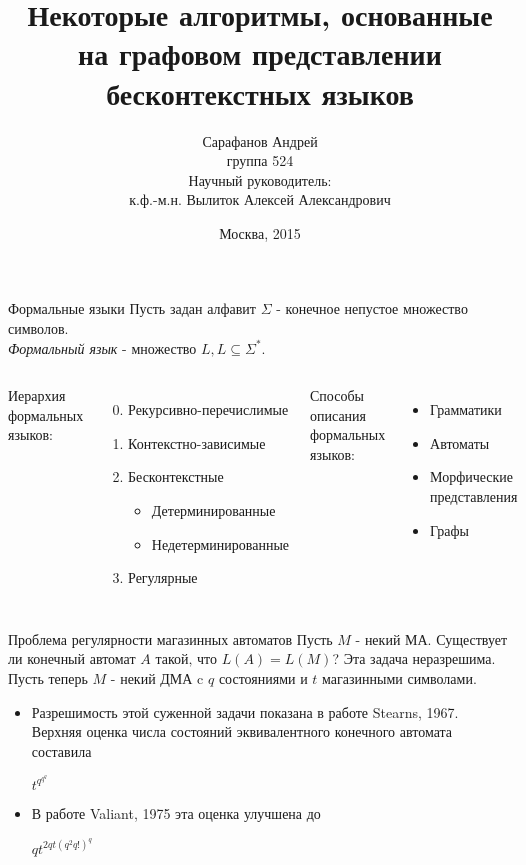 \documentclass{beamer}
\title []{Некоторые алгоритмы, основанные на графовом представлении бесконтекстных языков}
\author {Сарафанов Андрей \\ \small{группа 524\\ \vspace{1cm}Научный руководитель:\\
  к.ф.-м.н. Вылиток Алексей Александрович\\}}
\date {\footnotesize{Москва, 2015}}
\begin{document}
\begin{frame}
  \titlepage
\end{frame}

\begin{frame} {Формальные языки}
Пусть задан алфавит $\Sigma$ - конечное непустое множество символов.\\
\textit{Формальный язык} - множество $L, L\subseteq \Sigma^*$.
\vspace{5mm} %
\begin{columns}
    Иерархия формальных языков:
    \begin{enumerate}
      \setcounter{enumi}{-1}
      \item Рекурсивно-перечислимые
      \item Контекстно-зависимые
      \item Бесконтекстные
        \begin{itemize}
          \item Детерминированные
          \item Недетерминированные
        \end{itemize}
      \item Регулярные
    \end{enumerate}
    Способы описания формальных языков:
    \begin{itemize}
      \item Грамматики
      \item Автоматы
      \item Морфические представления
      \item Графы
    \end{itemize}
\end{columns}
\end{frame}

\begin{frame} {Проблема регулярности магазинных автоматов}
Пусть $M$ - некий МА. Существует ли конечный автомат $A \text{ такой, что } L(A)=L(M)$?
Эта задача неразрешима.\\
\vspace{0.5cm}
Пусть теперь $M$ - некий ДМА c $q$ состояниями и $t$ магазинными символами.
  \begin{itemize}
    \item Разрешимость этой суженной задачи показана в работе Stearns, 1967. Верхняя оценка числа состояний эквивалентного конечного автомата составила {\LARGE$t^{q^{q^q}}$\par}
    \item В работе Valiant, 1975 эта оценка улучшена до {\LARGE$qt^{2qt(q^2q!)^q}$\par}
  \end{itemize}
\end{frame}
\end{document}
